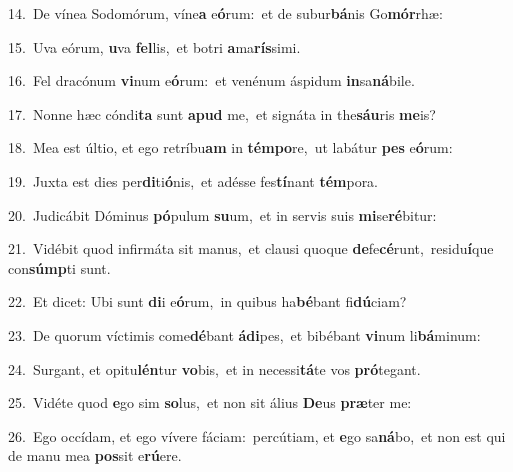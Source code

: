 {\numbfont\textcolor{\numbcolor}{14.}}~De vínea Sodomórum, víne\textbf{a} e\-\textbf{ó}\-rum:~\star et de subur\-\textbf{bá}\-nis Go\-\textbf{mór}\-rhæ:\par
{\numbfont\textcolor{\numbcolor}{15.}}~Uva eórum, \textbf{u}\-va \textbf{fel}\-lis,~\star et botri \textbf{a}\-ma\-\textbf{rís}\-simi.\par
{\numbfont\textcolor{\numbcolor}{16.}}~Fel dracónum \textbf{vi}\-num e\-\textbf{ó}\-rum:~\star et venénum áspidum \textbf{in}\-sa\-\textbf{ná}\-bile.\par
{\numbfont\textcolor{\numbcolor}{17.}}~Nonne hæc cóndi\textbf{ta} sunt \textbf{a}\-\textbf{pud} me,~\star et signáta in the\-\textbf{sáu}\-ris \textbf{me}\-is?\par
{\numbfont\textcolor{\numbcolor}{18.}}~Mea est últio, et ego retríbu\textbf{am} in \textbf{tém}\-\textbf{po}re,~\star ut labátur \textbf{pes} e\-\textbf{ó}\-rum:\par
{\numbfont\textcolor{\numbcolor}{19.}}~Juxta est dies per\-\textbf{di}\-ti\-\textbf{ó}\-nis,~\star et adésse fes\-\textbf{tí}\-nant \textbf{tém}\-pora.\par
{\numbfont\textcolor{\numbcolor}{20.}}~Judicábit Dóminus \textbf{pó}\-pulum \textbf{su}\-um,~\star et in servis suis \textbf{mi}\-se\-\textbf{ré}\-bitur:\par
{\numbfont\textcolor{\numbcolor}{21.}}~Vidébit quod infirmáta sit manus,~\dagger et clausi quoque \textbf{de}\-fe\-\textbf{cé}\-runt,~\star residu\-\textbf{í}\-que con\-\textbf{súmp}\-ti sunt.\par
{\numbfont\textcolor{\numbcolor}{22.}}~Et dicet: Ubi sunt \textbf{di}\-i e\-\textbf{ó}\-rum,~\star in quibus ha\-\textbf{bé}\-bant fi\-\textbf{dú}\-ciam?\par
{\numbfont\textcolor{\numbcolor}{23.}}~De quorum víctimis come\-\textbf{dé}\-bant \textbf{á}\-\textbf{di}pes,~\star et bibébant \textbf{vi}\-num li\-\textbf{bá}\-minum:\par
{\numbfont\textcolor{\numbcolor}{24.}}~Surgant, et opitu\-\textbf{lén}\-tur \textbf{vo}\-bis,~\star et in necessi\-\textbf{tá}\-te vos \textbf{pró}\-tegant.\par
{\numbfont\textcolor{\numbcolor}{25.}}~Vidéte quod \textbf{e}\-go sim \textbf{so}\-lus,~\star et non sit álius \textbf{De}\-us \textbf{præ}\-ter me:\par
{\numbfont\textcolor{\numbcolor}{26.}}~Ego occídam, et ego vívere fáciam:~\dagger percútiam, et \textbf{e}\-go sa\-\textbf{ná}\-bo,~\star et non est qui de manu mea \textbf{pos}\-sit e\-\textbf{rú}\-ere.\par
